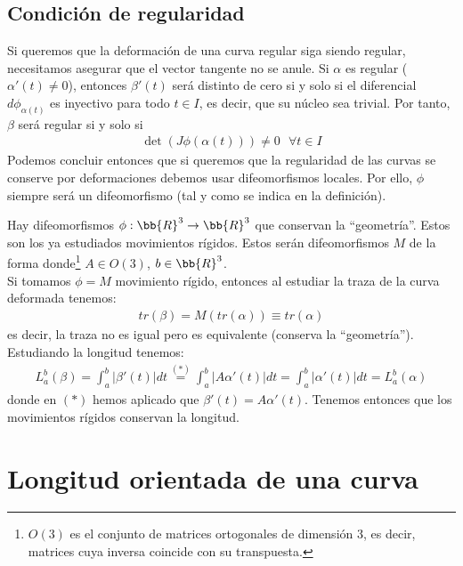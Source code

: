 \subsection{Condición de regularidad}

Si queremos que la deformación de una curva regular siga siendo regular, necesitamos asegurar que el vector tangente no se anule. Si $\alpha$ es regular ($\alpha'(t) \neq 0$), entonces $\beta'(t)$ será distinto de cero si y solo si el diferencial $d\phi_{\alpha(t)}$ es inyectivo para todo $t\in I$, es decir, que su núcleo sea trivial. Por tanto, $\beta$ será regular si y solo si
\begin{gather*}
    \det(J\phi(\alpha(t))) \neq 0\ \ \ \forall t \in I
\end{gather*}
Podemos concluir entonces que si queremos que la regularidad de las curvas se conserve por deformaciones debemos usar difeomorfismos locales. Por ello, $\phi$ siempre será un difeomorfismo (tal y como se indica en la definición).\\

\begin{observacion}
    Hay difeomorfismos $\phi : \bb{R}^3 \to \bb{R}^3$ que conservan la ``geometría''. Estos son los ya estudiados movimientos rígidos. Estos serán difeomorfismos $M$ de la forma
    donde\footnote{$O(3)$ es el conjunto de matrices ortogonales de dimensión 3, es decir, matrices cuya inversa coincide con su transpuesta.} $A\in O(3)$, $b\in \bb{R}^3$.\\

    Si tomamos $\phi = M$ movimiento rígido, entonces al estudiar la traza de la curva deformada tenemos:
    \begin{gather*}
        tr(\beta) = M (tr(\alpha)) \equiv tr(\alpha)
    \end{gather*}
    es decir, la traza no es igual pero es equivalente (conserva la ``geometría''). Estudiando la longitud tenemos:
    \begin{gather*}
        L_a^b (\beta) = \int_a^b |\beta'(t)| dt \overset{(\ast)}{=} \int_a^b |A\alpha'(t)| dt = \int_a^b |\alpha'(t)| dt = L_a^b (\alpha)
    \end{gather*}
    donde en $(\ast)$ hemos aplicado que $\beta'(t)=A\alpha'(t)$. Tenemos entonces que los movimientos rígidos conservan la longitud.
\end{observacion}

\section{Longitud orientada de una curva}


